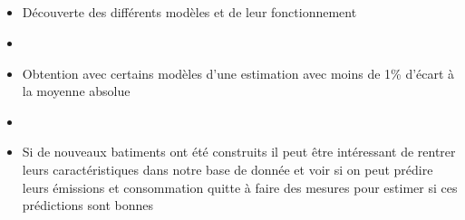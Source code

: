 \documentclass[8pt,aspectratio=169,hyperref={unicode=true}]{beamer}
\begin{document}
\subsection{}
\begin{frame}{\insertsection}
  \begin{itemize}
    \item Découverte des différents modèles et de leur fonctionnement
    \item[]
    \item Obtention avec certains modèles d'une estimation avec moins de 1\% d'écart
          à la moyenne absolue
    \item[]
    \item Si de nouveaux batiments ont été construits il peut être intéressant de rentrer leurs
          caractéristiques dans notre base de donnée et voir si on peut prédire leurs émissions
          et consommation quitte à faire des mesures pour estimer si ces prédictions sont bonnes
  \end{itemize}
\end{frame}
\end{document}
